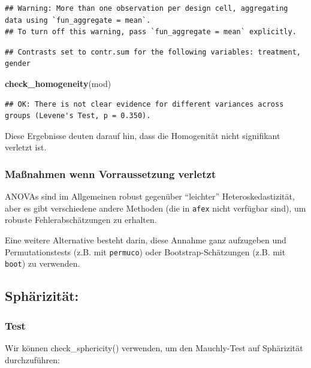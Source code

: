 \documentclass[
]{book}
\newenvironment{Shaded}{\begin{snugshade}}{\end{snugshade}}
\newcommand{\FunctionTok}[1]{\textcolor[rgb]{0.13,0.29,0.53}{\textbf{#1}}}
\newcommand{\NormalTok}[1]{#1}
\begin{document}
\begin{verbatim}
## Warning: More than one observation per design cell, aggregating data using `fun_aggregate = mean`.
## To turn off this warning, pass `fun_aggregate = mean` explicitly.
\end{verbatim}

\begin{verbatim}
## Contrasts set to contr.sum for the following variables: treatment, gender
\end{verbatim}

\begin{Shaded}
\begin{Highlighting}[]
\FunctionTok{check\_homogeneity}\NormalTok{(mod)}
\end{Highlighting}
\end{Shaded}

\begin{verbatim}
## OK: There is not clear evidence for different variances across groups (Levene's Test, p = 0.350).
\end{verbatim}

Diese Ergebnisse deuten darauf hin, dass die Homogenität nicht signifikant verletzt ist.

\subsubsection{Maßnahmen wenn Vorraussetzung verletzt}\label{mauxdfnahmen-wenn-vorraussetzung-verletzt}

ANOVAs sind im Allgemeinen robust gegenüber ``leichter'' Heteroskedastizität, aber es gibt verschiedene andere Methoden (die in \texttt{afex} nicht verfügbar sind), um robuste Fehlerabschätzungen zu erhalten.

Eine weitere Alternative besteht darin, diese Annahme ganz aufzugeben und Permutationstests (z.B. mit \texttt{permuco}) oder Bootstrap-Schätzungen (z.B. mit \texttt{boot}) zu verwenden.

\subsection{Sphärizität:}\label{sphuxe4rizituxe4t}

\subsubsection{Test}\label{test-1}

Wir können check\_sphericity() verwenden, um den Mauchly-Test auf Sphärizität durchzuführen:
\end{document}

